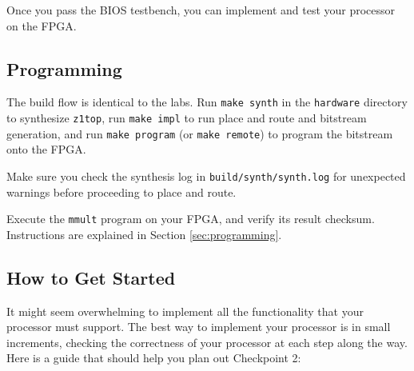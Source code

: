 Once you pass the BIOS testbench, you can implement and test your processor on the FPGA.


\subsection{Programming}
The build flow is identical to the labs.
Run \verb|make synth| in the \verb|hardware| directory to synthesize \verb|z1top|,
run \verb|make impl| to run place and route and bitstream generation,
and run \verb|make program| (or \verb|make remote|) to program the bitstream onto the FPGA.

Make sure you check the synthesis log in \verb|build/synth/synth.log|
for unexpected warnings before proceeding to place and route.

Execute the \verb|mmult| program on your FPGA, and verify its result checksum.
Instructions are explained in Section \ref{sec:programming}.


\subsection{How to Get Started}
It might seem overwhelming to implement all the functionality that your processor must support. The best way to implement your processor is in small increments, checking the correctness of your processor at each step along the way. Here is a guide that should help you plan out Checkpoint 2:

